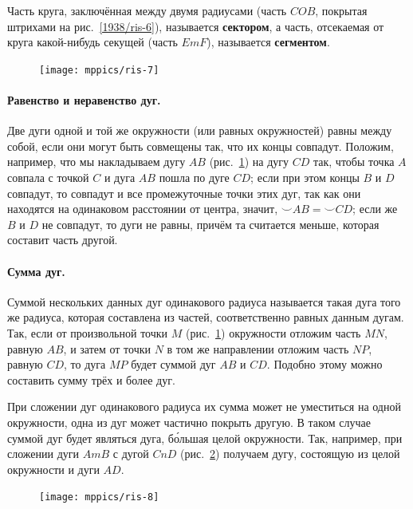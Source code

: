 \documentclass[twoside]{book}
\makeatletter
\newcommand{\rindex}[2][\imki@jobname]{%
  \index[#1]{\detokenize{#2}}%
}
\makeatother
\begin{document}
Часть круга, заключённая между двумя радиусами (часть $COB$, покрытая штрихами на рис.~\ref{1938/ris-6}), называется \rindex{сектор}\textbf{сектором}, а часть, отсекаемая от круга какой-нибудь секущей (часть $EmF$), называется \rindex{сегмент}\textbf{сегментом}.

\begin{figure}
\centering
\texttt{[image: mppics/ris-7]}
\caption{}\label{1938/ris-7}
\end{figure}

\paragraph{Равенство и неравенство дуг.}\label{1938/10}
Две дуги одной и той же окружности (или равных окружностей) равны между собой, если они могут быть совмещены так, что их концы совпадут.
Положим, например, что мы накладываем дугу $AB$ (рис.~\ref{1938/ris-7}) на дугу $CD$ так, чтобы точка $A$ совпала с точкой $C$ и дуга $AB$ пошла по дуге $CD$;
если при этом концы $B$ и $D$ совпадут, то совпадут и все промежуточные точки этих дуг, так как они находятся на одинаковом расстоянии от центра, значит, ${\smallsmile} AB={\smallsmile} CD$;
если же $B$ и $D$ не совпадут, то дуги не равны, причём та считается меньше, которая составит часть другой.

\paragraph{Сумма дуг.}\label{1938/11}
Суммой нескольких данных дуг одинакового радиуса называется такая дуга того же радиуса, которая составлена из частей, соответственно равных данным дугам.
Так, если от произвольной точки $M$ (рис.~\ref{1938/ris-7}) окружности отложим часть $MN$, равную $AB$, и затем от точки $N$ в том же направлении отложим часть $NP$, равную $CD$, то дуга $MP$ будет суммой дуг $AB$ и $CD$.
Подобно этому можно составить сумму трёх и более дуг.

При сложении дуг одинакового радиуса их сумма может не уместиться на одной окружности, одна из дуг может частично покрыть другую.
В таком случае суммой дуг будет являться дуга, б\'{о}льшая целой окружности.
Так, например, при сложении дуги $AmB$ с дугой $CnD$ (рис.~\ref{1938/ris-8}) получаем дугу, состоящую из целой окружности и дуги $AD$.

\begin{figure}[h!]
\centering
\texttt{[image: mppics/ris-8]}
\caption{}\label{1938/ris-8}
\end{figure}
\end{document}
